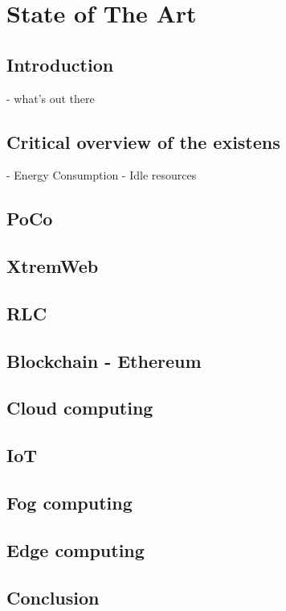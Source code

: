 

\chapter{State of The Art}

\ifpdf
    \graphicspath{{Chapter3/Figs/Raster/}{Chapter3/Figs/PDF/}{Chapter3/Figs/}}
\else
    \graphicspath{{Chapter3/Figs/Vector/}{Chapter3/Figs/}}
\fi


\section{Introduction}
- what's out there

\section{Critical overview of the existens}
    - Energy Consumption
    - Idle resources

\section{PoCo}
\section{XtremWeb}
\section{RLC}
\section{Blockchain - Ethereum}
\section{Cloud computing}
\section{IoT}
\section{Fog computing}
\section{Edge computing}
\section{}

\section{Conclusion}